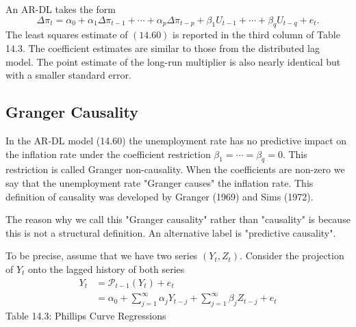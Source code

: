 \documentclass[10pt]{article}
\begin{document}
An AR-DL takes the form
$$
\Delta \pi_{t}=\alpha_{0}+\alpha_{1} \Delta \pi_{t-1}+\cdots+\alpha_{p} \Delta \pi_{t-p}+\beta_{1} U_{t-1}+\cdots+\beta_{q} U_{t-q}+e_{t} .
$$
The least squares estimate of $(14.60)$ is reported in the third column of Table 14.3. The coefficient estimates are similar to those from the distributed lag model. The point estimate of the long-run multiplier is also nearly identical but with a smaller standard error.

\subsection{Granger Causality}
In the AR-DL model (14.60) the unemployment rate has no predictive impact on the inflation rate under the coefficient restriction $\beta_{1}=\cdots=\beta_{q}=0$. This restriction is called Granger non-causality. When the coefficients are non-zero we say that the unemployment rate "Granger causes" the inflation rate. This definition of causality was developed by Granger (1969) and Sims (1972).

The reason why we call this "Granger causality" rather than "causality" is because this is not a structural definition. An alternative label is "predictive causality".

To be precise, assume that we have two series $\left(Y_{t}, Z_{t}\right)$. Consider the projection of $Y_{t}$ onto the lagged history of both series
$$
\begin{aligned}
Y_{t} &=\mathscr{P}_{t-1}\left(Y_{t}\right)+e_{t} \\
&=\alpha_{0}+\sum_{j=1}^{\infty} \alpha_{j} Y_{t-j}+\sum_{j=1}^{\infty} \beta_{j} Z_{t-j}+e_{t}
\end{aligned}
$$
Table 14.3: Phillips Curve Regressions
\end{document}
